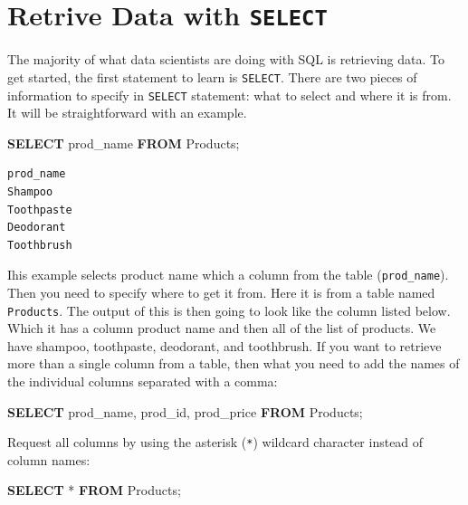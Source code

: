\documentclass[]{book}
\newenvironment{Shaded}{\begin{snugshade}}{\end{snugshade}}
\newcommand{\KeywordTok}[1]{\textcolor[rgb]{0.13,0.29,0.53}{\textbf{{#1}}}}
\newcommand{\NormalTok}[1]{{#1}}
\theoremstyle{definition}
\theoremstyle{definition}
\theoremstyle{remark}
\begin{document}
\section{\texorpdfstring{Retrive Data with
\texttt{SELECT}}{Retrive Data with SELECT}}\label{retrive-data-with-select}

The majority of what data scientists are doing with SQL is retrieving
data. To get started, the first statement to learn is \texttt{SELECT}.
There are two pieces of information to specify in \texttt{SELECT}
statement: what to select and where it is from. It will be
straightforward with an example.

\begin{Shaded}
\begin{Highlighting}[]
\KeywordTok{SELECT} \NormalTok{prod_name}
\KeywordTok{FROM} \NormalTok{Products;}
\end{Highlighting}
\end{Shaded}

\begin{verbatim}
prod_name
Shampoo
Toothpaste
Deodorant
Toothbrush
\end{verbatim}

Ihis example selects product name which a column from the table
(\texttt{prod\_name}). Then you need to specify where to get it from.
Here it is from a table named \texttt{Products}. The output of this is
then going to look like the column listed below. Which it has a column
product name and then all of the list of products. We have shampoo,
toothpaste, deodorant, and toothbrush. If you want to retrieve more than
a single column from a table, then what you need to add the names of the
individual columns separated with a comma:

\begin{Shaded}
\begin{Highlighting}[]
\KeywordTok{SELECT} \NormalTok{prod_name, prod_id, prod_price}
\KeywordTok{FROM} \NormalTok{Products;}
\end{Highlighting}
\end{Shaded}

Request all columns by using the asterisk (\texttt{*}) wildcard
character instead of column names:

\begin{Shaded}
\begin{Highlighting}[]
\KeywordTok{SELECT} \NormalTok{*}
\KeywordTok{FROM} \NormalTok{Products;}
\end{Highlighting}
\end{Shaded}
\end{document}
